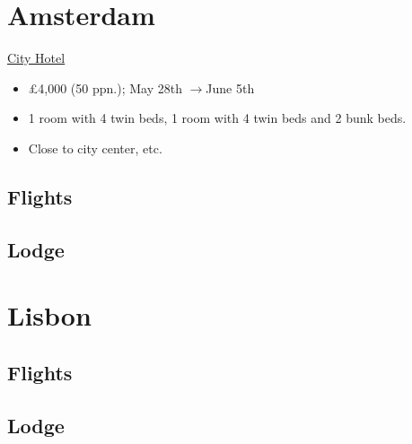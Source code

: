 \documentclass[12pt]{article}
\renewcommand{\to}{$\rightarrow$}
\newcommand{\cost}[2]{\pounds#1 (#2 ppn.)}
\begin{document}
	\section{Amsterdam}
	\href{https://www.booking.com/hotel/nl/cityhotelamsterdam.html?sid=3f62ec944d118827daff72c411262409&aid=355028&ucfs=1&arphpl=1&checkin=2022-05-28&checkout=2022-06-05&dest_id=145&dest_type=district&group_adults=10&req_adults=10&no_rooms=1&group_children=0&req_children=0&hpos=2&hapos=2&sr_order=popularity&srpvid=5a3f77194b1f019a&srepoch=1648313785&all_sr_blocks=1049823_95128969_0_2_0%2C1049807_95128969_0_2_0&highlighted_blocks=1049823_95128969_0_2_0%2C1049807_95128969_0_2_0&matching_block_id=1049823_95128969_0_2_0&sr_pri_blocks=1049823_95128969_0_2_0__271755%2C1049807_95128969_0_2_0__203115&from=searchresults#hotelTmpl}{City Hotel}
	\begin{itemize}
		\item \cost{4,000}{50}; May 28th \to June 5th 
		\item 1 room with 4 twin beds, 1 room with 4 twin beds and 2 bunk beds.
		\item Close to city center, etc.
	\end{itemize}
	
	
	\subsection{Flights}
	
	\subsection{Lodge}
	
	\section{Lisbon}
	
	\subsection{Flights}
	
	\subsection{Lodge}
\end{document}
